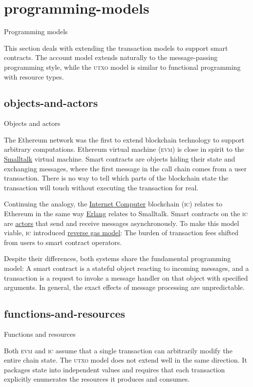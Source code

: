 \documentclass{article}
\begin{document}
\section{programming-models}{Programming models}

This section deals with extending the transaction models to support smart contracts.
The account model extends naturally to the message-passing programming style,
while the \textsc{utxo} model is similar to functional programming with resource types.

\subsection{objects-and-actors}{Objects and actors}

The Ethereum network was the first to extend blockchain technology to support arbitrary computations.
Ethereum virtual machine (\textsc{evm}) is close in spirit to the \href{https://en.wikipedia.org/wiki/Smalltalk}{Smalltalk} virtual machine.
Smart contracts are objects hiding their state and exchanging messages,
where the first message in the call chain comes from a user transaction.
There is no way to tell which parts of the blockchain state the transaction will touch without executing the transaction for real.

Continuing the analogy, the \href{https://internetcomputer.org/}{Internet Computer} blockchain (\textsc{ic}) relates to Ethereum
in the same way \href{https://www.erlang.org/}{Erlang} relates to Smalltalk.
Smart contracts on the \textsc{ic} are \href{https://en.wikipedia.org/wiki/Actor_model}{actors} that send and receive messages asynchronously.
To make this model viable, \textsc{ic} introduced \href{https://internetcomputer.org/capabilities/reverse-gas/}{reverse gas model}:
The burden of transaction fees shifted from users to smart contract operators.

Despite their differences, both systems share the fundamental programming model:
A smart contract is a stateful object reacting to incoming messages,
and a transaction is a request to invoke a message handler on that object with specified arguments.
In general, the exact effects of message processing are unpredictable.

\subsection{functions-and-resources}{Functions and resources}

Both \textsc{evm} and \textsc{ic} assume that a single transaction can arbitrarily modify the entire chain state.
The \textsc{utxo} model does not extend well in the same direction.
It packages state into independent values and requires that each transaction explicitly enumerates the resources it produces and consumes.
\end{document}

